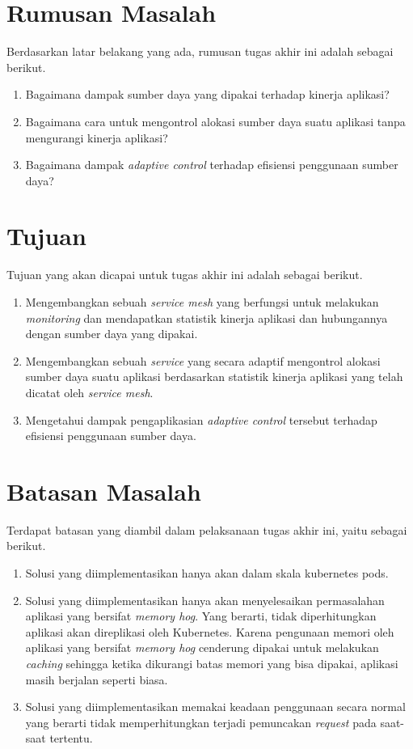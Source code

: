 \section{Rumusan Masalah}

Berdasarkan latar belakang yang ada, rumusan tugas akhir ini adalah sebagai berikut.
\begin{enumerate}
    \item Bagaimana dampak sumber daya yang dipakai terhadap kinerja aplikasi?
    \item Bagaimana cara untuk mengontrol alokasi sumber daya suatu aplikasi tanpa mengurangi kinerja aplikasi?
    \item Bagaimana dampak \textit{adaptive control} terhadap efisiensi penggunaan sumber daya?
\end{enumerate}

\section{Tujuan}

Tujuan yang akan dicapai untuk tugas akhir ini adalah sebagai berikut.

\begin{enumerate}
    \item Mengembangkan sebuah \textit{service mesh} yang berfungsi untuk melakukan \textit{monitoring} dan mendapatkan statistik kinerja aplikasi dan hubungannya dengan sumber daya yang dipakai.

    \item Mengembangkan sebuah \textit{service} yang secara adaptif mengontrol alokasi sumber daya suatu aplikasi berdasarkan statistik kinerja aplikasi yang telah dicatat oleh \textit{service mesh}.

    \item Mengetahui dampak pengaplikasian \textit{adaptive control} tersebut terhadap efisiensi penggunaan sumber daya.
\end{enumerate}

\section{Batasan Masalah}

Terdapat batasan yang diambil dalam pelaksanaan tugas akhir ini, yaitu sebagai berikut.

\begin{enumerate}
    \item Solusi yang diimplementasikan hanya akan dalam skala kubernetes pods.
    \item Solusi yang diimplementasikan hanya akan menyelesaikan permasalahan aplikasi yang bersifat \textit{memory hog}. Yang berarti, tidak diperhitungkan aplikasi akan direplikasi oleh Kubernetes. Karena pengunaan memori oleh aplikasi yang bersifat \textit{memory hog} cenderung dipakai untuk melakukan \textit{caching} sehingga ketika dikurangi batas memori yang bisa dipakai, aplikasi masih berjalan seperti biasa.
    \item Solusi yang diimplementasikan memakai keadaan penggunaan secara normal yang berarti tidak memperhitungkan terjadi pemuncakan \textit{request} pada saat-saat tertentu.
\end{enumerate}

